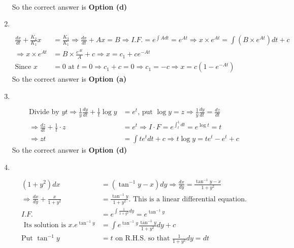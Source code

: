 \begin{enumerate}
\begin{answer}
\begin{align*}
	\end{align*}
		So the correct answer is \textbf{Option (d)}
\end{answer}
	\item $\left. \right. $
\begin{answer}
	\begin{align*}
	\frac{d x}{d t}+\frac{K_{2}}{K_{1}} x&=\frac{K_{3}}{K_{1}} \Rightarrow \frac{d x}{d t}+A x=B \Rightarrow I . F .=e^{\int A d t}=e^{A t} \Rightarrow x \times e^{A t}=\int\left(B \times e^{A t}\right) d t+c\\
	\Rightarrow x \times e^{A t}&=B \times \frac{e^{A t}}{A}+c \Rightarrow x=c_{1}+c e^{-A t}\\
	\text{Since }x&=0\text{ at }t=0 \Rightarrow c_{1}+c=0 \Rightarrow c_{1}=-c \Rightarrow x=c\left(1-e^{-A t}\right)
	\end{align*}
		So the correct answer is \textbf{Option (a)}
\end{answer}
	\item $\left. \right. $
\begin{answer}
	\begin{align*}
	\text{Divide by }y t \Rightarrow \frac{1}{y} \frac{d y}{d t}+\frac{1}{t} \log y&=e^{t}\text{, put }\log y=z \Rightarrow \frac{1}{y} \frac{d y}{d t}=\frac{d z}{d t}\\
	\Rightarrow \frac{d z}{d t}+\frac{1}{t} \cdot z&=e^{t} \Rightarrow I \cdot F=e^{\int_{t}^{1} d t}=e^{\log t}=t\\
	\Rightarrow z t&=\int t e^{t} d t+c \Rightarrow t \log y=t e^{t}-e^{t}+c
	\end{align*}
		So the correct answer is \textbf{Option (d)}
\end{answer}
	\item $\left. \right. $
\begin{answer}
	\begin{align*}
	\left(1+y^{2}\right) d x&=\left(\tan ^{-1} y-x\right) d y \Rightarrow \frac{d x}{d y}=\frac{\tan ^{-1} y-x}{1+y^{2}}\\
	\Rightarrow \frac{d x}{d y}+\frac{x}{1+y^{2}}&=\frac{\tan ^{-1} y}{1+y^{2}}.\text{ This is a linear differential equation.}\\
	I . F .&=e^{\int \frac{1}{1+y^{2}} d y}=e^{\tan ^{-1} y}\\
	\text{	Its solution is }x . e^{\tan ^{-1} y}&=\int e^{\tan ^{-1} y} \frac{\tan ^{-1} y}{1+y^{2}} d y+c\\
	\text{Put }\tan ^{-1} y&=t\text{ on R.H.S. so that }\frac{1}{1+y^{2}} d y=d t\\

\end{align*}
\end{answer}
\end{enumerate}
